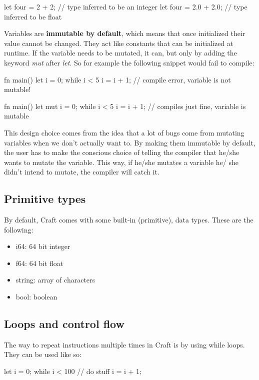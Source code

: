 ﻿\documentclass[10pt,a4paper,twocolumn,twoside]{article}
\begin{document}
\begin{code}
let four = 2 + 2; // type inferred to be an integer
let four = 2.0 + 2.0; // type inferred to be float
\end{code}

Variables are \textbf{immutable by default}, which means that once initialized
their value cannot be changed. They act like constants that can be initialized
at runtime. If the variable needs to be mutated, it can, but only by adding the
keyword \textit{mut} after \textit{let}. So for example the following snippet
would fail to compile:

\begin{code}
    fn main() {
        let i = 0;
        while i < 5 {
            i = i + 1; // compile error, variable is not mutable!
        }
    }
\end{code}

\begin{code}
    fn main() {
        let mut i = 0;
        while i < 5 {
            i = i + 1; // compiles just fine, variable is mutable
        }
    }
\end{code}

This design choice comes from the idea that a lot of bugs come from 
mutating variables when we don't actually want to. By making them immutable by
default, the user has to make the conscious choice of telling the compiler that
he/she wants to mutate the variable. This way, if he/she mutates a variable he/
she didn't intend to mutate, the compiler will catch it.

\subsection{Primitive types}
By default, Craft comes with some built-in (primitive), data types. These are
the following:

\begin{itemize}
    \item i64: 64 bit integer
    \item f64: 64 bit float
    \item string: array of characters
    \item bool: boolean
\end{itemize}

\subsection{Loops and control flow}
The way to repeat instructions multiple times in Craft is by using while loops.
They can be used like so:
\begin{code}
    let i = 0;
    while i < 100 {
        // do stuff
        i = i + 1;
    }
\end{code}
\end{document}
